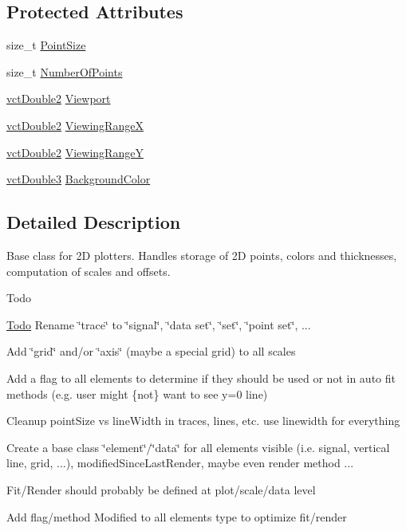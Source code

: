 \subsection*{Protected Attributes}
\begin{DoxyCompactItemize}
\item 
size\+\_\+t \hyperlink{classvct_plot2_d_base_a4f238d9c5cefdb5c623b4967ba0e678b}{Point\+Size}
\item 
size\+\_\+t \hyperlink{classvct_plot2_d_base_af1645f053dd8310557ec4595d43516a8}{Number\+Of\+Points}
\item 
\hyperlink{vct_fixed_size_vector_types_8h_afc0fdcc41cbe8b043747612501610812}{vct\+Double2} \hyperlink{classvct_plot2_d_base_a35e351a70eb6b942f80d354a74a9eb8b}{Viewport}
\item 
\hyperlink{vct_fixed_size_vector_types_8h_afc0fdcc41cbe8b043747612501610812}{vct\+Double2} \hyperlink{classvct_plot2_d_base_aac54c32c843faaba49bfa0424ac4009f}{Viewing\+Range\+X}
\item 
\hyperlink{vct_fixed_size_vector_types_8h_afc0fdcc41cbe8b043747612501610812}{vct\+Double2} \hyperlink{classvct_plot2_d_base_a61aef57ba3009eef0104325f64c8524f}{Viewing\+Range\+Y}
\item 
\hyperlink{vct_fixed_size_vector_types_8h_a4a89122c9d7f72c3f31fe8126e17c3af}{vct\+Double3} \hyperlink{classvct_plot2_d_base_a74038c085cabcddebdb1195dc0062ddf}{Background\+Color}
\end{DoxyCompactItemize}


\subsection{Detailed Description}
Base class for 2\+D plotters. Handles storage of 2\+D points, colors and thicknesses, computation of scales and offsets.

\begin{DoxyRefDesc}{Todo}
\item[\hyperlink{todo__todo000004}{Todo}]Rename \char`\"{}trace\char`\"{} to \char`\"{}signal\char`\"{}, \char`\"{}data set\char`\"{}, \char`\"{}set\char`\"{}, \char`\"{}point set\char`\"{}, ... 

Add \char`\"{}grid\char`\"{} and/or \char`\"{}axis\char`\"{} (maybe a special grid) to all scales 

Add a flag to all elements to determine if they should be used or not in auto fit methods (e.\+g. user might \{not\} want to see y=0 line) 

Cleanup point\+Size vs line\+Width in traces, lines, etc. use linewidth for everything 

Create a base class \char`\"{}element\char`\"{}/\char`\"{}data\char`\"{} for all elements visible (i.\+e. signal, vertical line, grid, ...), modified\+Since\+Last\+Render, maybe even render method ... 

Fit/\+Render should probably be defined at plot/scale/data level 

Add flag/method Modified to all elements type to optimize fit/render \end{DoxyRefDesc}


